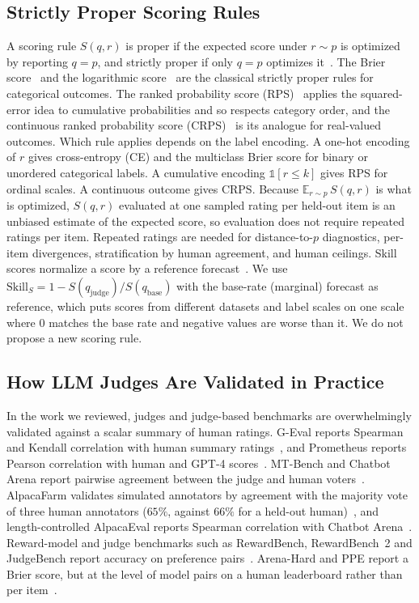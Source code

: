 \subsection{Strictly Proper Scoring Rules}
\label{sec:supp-proper}
A scoring rule $S(q,r)$ is proper if the expected score under $r\sim p$ is optimized by reporting $q=p$, and strictly proper if only $q=p$ optimizes it~\citep{gneiting2007strictly}.
The Brier score~\citep{brier1950verification} and the logarithmic score~\citep{good1952rational} are the classical strictly proper rules for categorical outcomes.
The ranked probability score (RPS)~\citep{epstein1969scoring,murphy1971note} applies the squared-error idea to cumulative probabilities and so respects category order, and the continuous ranked probability score (CRPS)~\citep{matheson1976scoring} is its analogue for real-valued outcomes.
Which rule applies depends on the label encoding.
A one-hot encoding of $r$ gives cross-entropy (CE) and the multiclass Brier score for binary or unordered categorical labels.
A cumulative encoding $\mathbb{1}[r\le k]$ gives RPS for ordinal scales.
A continuous outcome gives CRPS.
Because $\mathbb{E}_{r\sim p}\,S(q,r)$ is what is optimized, $S(q,r)$ evaluated at one sampled rating per held-out item is an unbiased estimate of the expected score, so evaluation does not require repeated ratings per item.
Repeated ratings are needed for distance-to-$p$ diagnostics, per-item divergences, stratification by human agreement, and human ceilings.
Skill scores normalize a score by a reference forecast~\citep{murphy1989skill}.
We use $\mathrm{Skill}_S = 1 - S(q_{\mathrm{judge}})/S(q_{\mathrm{base}})$ with the base-rate (marginal) forecast as reference, which puts scores from different datasets and label scales on one scale where $0$ matches the base rate and negative values are worse than it.
We do not propose a new scoring rule.

\subsection{How LLM Judges Are Validated in Practice}
\label{sec:supp-practice}
In the work we reviewed, judges and judge-based benchmarks are overwhelmingly validated against a scalar summary of human ratings.
G-Eval reports Spearman and Kendall correlation with human summary ratings~\citep{liu2023geval}, and Prometheus reports Pearson correlation with human and GPT-4 scores~\citep{kim2024prometheus,kim2024prometheus2}.
MT-Bench and Chatbot Arena report pairwise agreement between the judge and human voters~\citep{zheng2023judging,chiang2024chatbot}.
AlpacaFarm validates simulated annotators by agreement with the majority vote of three human annotators ($65\%$, against $66\%$ for a held-out human)~\citep{dubois2023alpacafarm}, and length-controlled AlpacaEval reports Spearman correlation with Chatbot Arena~\citep{dubois2024lengthcontrolled}.
Reward-model and judge benchmarks such as RewardBench, RewardBench~2 and JudgeBench report accuracy on preference pairs~\citep{lambert2025rewardbench,malik2026rewardbench2,tan2025judgebench}.
Arena-Hard and PPE report a Brier score, but at the level of model pairs on a human leaderboard rather than per item~\citep{li2025arenahard,frick2025ppe}.

